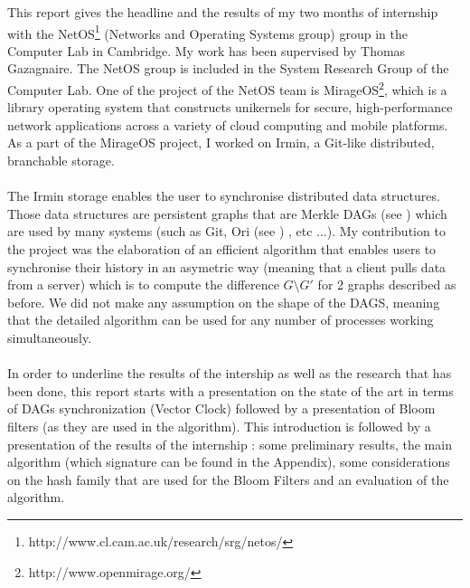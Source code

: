 This report gives the headline and the results of my two months of internship with the NetOS\footnote{http://www.cl.cam.ac.uk/research/srg/netos/} (Networks and Operating Systems group) group in the Computer Lab in Cambridge. My work has been supervised by Thomas Gazagnaire. The NetOS group is included in the System Research Group of the Computer Lab. One of the project of the NetOS team is MirageOS\footnote{http://www.openmirage.org/}, which is a library operating system that constructs unikernels for secure, high-performance network applications across a variety of cloud computing and mobile platforms. As a part of the MirageOS project, I worked on Irmin, a Git-like distributed, branchable storage.

\paragraph{} The Irmin storage enables the user to synchronise distributed data structures. Those data structures are persistent graphs that are Merkle DAGs (see \cite{Becker_merklesignature}) which are used by many systems (such as Git, Ori (see \cite{Mashtizadeh:2013:RHG:2517349.2522721}) , etc ...). My contribution to the project was the elaboration of an efficient algorithm that enables users to synchronise their history in an asymetric way (meaning that a client pulls data from a server) which is to compute the difference $G \setminus G'$ for 2 graphs described as before. We did not make any assumption on the shape of the DAGS, meaning that the detailed algorithm can be used for any number of processes working simultaneously.

\paragraph{} In order to underline the results of the intership as well as the research that has been done, this report starts with a presentation on the state of the art in terms of DAGs synchronization (Vector Clock) followed by a presentation of Bloom filters (as they are used in the algorithm). This introduction is followed by a presentation of the results of the internship : some preliminary results, the main algorithm (which signature can be found in the Appendix), some considerations on the hash family that are used for the Bloom Filters and an evaluation of the algorithm.

